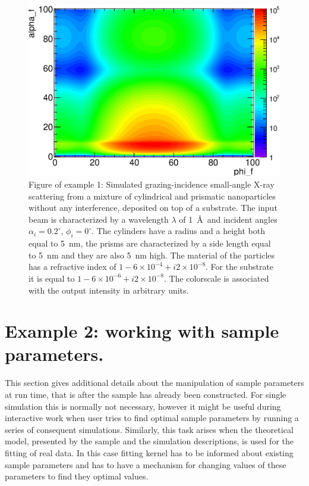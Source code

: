 \begin{figure}[p!]
  \begin{center}
   \includegraphics[clip=true, width=120mm]{Figures/Manual_ex1.eps}
  \end{center}
  \caption[Example 1: Simulated grazing-incidence small-angle X-ray scattering from a mixture of
cylindrical and prismatic nanoparticles without any interference, deposited on top
of a substrate]{Figure of example 1: Simulated grazing-incidence small-angle X-ray scattering from a mixture of
cylindrical and prismatic nanoparticles without any interference, deposited on top
of a substrate. The input beam is characterized by a wavelength
$\lambda$ of 1~\AA\ and incident angles $\alpha_i=0.2^{\circ}$, $\phi_i=0^{\circ}$. The
cylinders have a radius and a height both equal to 5~nm, the prisms
are characterized by a side length equal to 5~nm and they are also 5~nm high. The
material of the particles has a refractive index of $1-6\times 10^{-4}+i2\times 10^{-8}$. For the substrate
it is equal to $1-6\times 10^{-6} +i2\times 10^{-8} $. The colorscale
is associated with the output intensity in arbitrary units. }
\label{fig:output_ex1}
\end{figure}



%
\section{Example 2: working with sample parameters.} 

This section gives additional details about the manipulation of sample parameters
at run time, that is after the sample has already been constructed. 
For single simulation this is normally not necessary, however it might be useful
during interactive work when user tries to find optimal sample parameters by
running a series of consequent simulations.
Similarly, this task arises when the theoretical model, presented by the sample and the simulation descriptions, is used for the fitting of real data.
In this case fitting kernel has to be informed about existing sample parameters
and has to have a mechanism for changing values of these parameters to find 
they optimal values.

